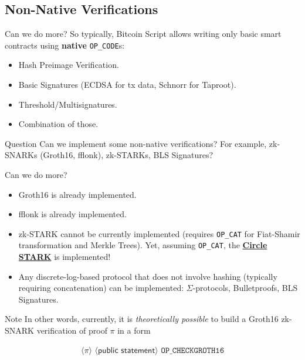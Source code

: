 \documentclass{zkdl-presentation-template}
\newcommand{\elem}[1]{\, \langle #1 \rangle \,}
\newcommand{\opcode}[1]{\, \texttt{#1} \,}
\newcommand{\cmark}{\textcolor{green!65!black}{\ding{51}}}%
\newcommand{\xmark}{\textcolor{red!80!black}{\ding{55}}}%
\begin{document}
    \subsection{Non-Native Verifications}
    \begin{frame}{Can we do more?}
        So typically, Bitcoin Script allows writing only basic smart contracts using \textbf{native} \texttt{OP\_CODE}s: 
        \begin{itemize}
            \item Hash Preimage Verification.
            \item Basic Signatures (ECDSA for tx data, Schnorr for Taproot).
            \item Threshold/Multisignatures.
            \item Combination of those.
        \end{itemize}

        \begin{alertblock}{Question}
            Can we implement some non-native verifications? For example, zk-SNARKs (Groth16, fflonk), zk-STARKs, BLS Signatures?
        \end{alertblock}
    \end{frame}

    \begin{frame}{Can we do more?}
        \begin{itemize}[label={}]
            \item \cmark \hspace{1px} Groth16 is already implemented.
            \item \cmark \hspace{1px} \textsf{fflonk} is already implemented.
            \item \xmark \hspace{1px} zk-STARK cannot be currently implemented (requires \texttt{OP\_CAT} for Fiat-Shamir transformation and Merkle Trees). Yet, assuming \texttt{OP\_CAT}, the \href{https://eprint.iacr.org/2024/278}{\textcolor{blue!70!white}{\textbf{Circle STARK}}} is implemented!
            \item \cmark \hspace{1px} Any discrete-log-based protocol that does not involve hashing (typically requiring concatenation) can be implemented: $\Sigma$-protocols, Bulletproofs, BLS Signatures.
        \end{itemize}

        \begin{block}{Note}
            In other words, currently, it is \textit{theoretically possible} to build a Groth16 zk-SNARK verification of proof $\pi$ in a form
            \begin{empheqboxed}
            \small
            \begin{align*}
                \elem{\pi} \elem{\textsf{public statement}} \opcode{OP\_CHECKGROTH16}
            \end{align*}
          \end{empheqboxed}
        \end{block}
    \end{frame}
\end{document}
